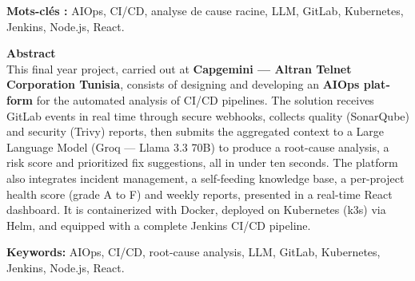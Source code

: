\documentclass[12pt,a4paper,oneside]{report}
\begin{document}
\textbf{Mots-clés :} AIOps, CI/CD, analyse de cause racine, LLM, GitLab, Kubernetes, Jenkins, Node.js, React.

\vspace{0.8cm}
\begin{otherlanguage}{english}
\noindent\textbf{\large Abstract}\\[6pt]
This final year project, carried out at \textbf{Capgemini --- Altran Telnet Corporation Tunisia}, consists of designing and developing an \textbf{AIOps platform} for the automated analysis of CI/CD pipelines. The solution receives GitLab events in real time through secure webhooks, collects quality (SonarQube) and security (Trivy) reports, then submits the aggregated context to a Large Language Model (Groq --- Llama 3.3 70B) to produce a root-cause analysis, a risk score and prioritized fix suggestions, all in under ten seconds. The platform also integrates incident management, a self-feeding knowledge base, a per-project health score (grade A to F) and weekly reports, presented in a real-time React dashboard. It is containerized with Docker, deployed on Kubernetes (k3s) via Helm, and equipped with a complete Jenkins CI/CD pipeline.

\noindent\textbf{Keywords:} AIOps, CI/CD, root-cause analysis, LLM, GitLab, Kubernetes, Jenkins, Node.js, React.
\end{otherlanguage}

\tableofcontents
\listoffigures
\listoftables

\end{document}
